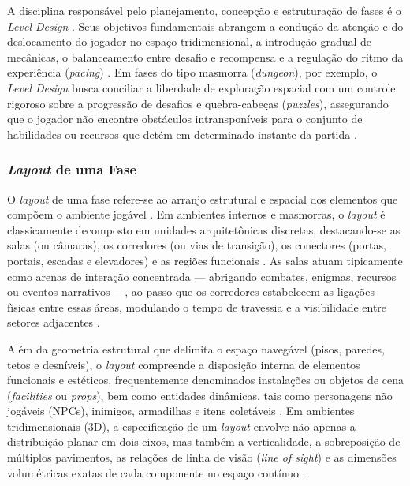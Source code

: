 A disciplina responsável pelo planejamento, concepção e estruturação de fases é o \textit{Level Design} \cite{dormans2010, tanagra, totten2014architectural}. Seus objetivos fundamentais abrangem a condução da atenção e do deslocamento do jogador no espaço tridimensional, a introdução gradual de mecânicas, o balanceamento entre desafio e recompensa e a regulação do ritmo da experiência (\textit{pacing}) \cite{dormans2010, linden2013designing, linden2014dungeons, totten2014architectural}. Em fases do tipo masmorra (\textit{dungeon}), por exemplo, o \textit{Level Design} busca conciliar a liberdade de exploração espacial com um controle rigoroso sobre a progressão de desafios e quebra-cabeças (\textit{puzzles}), assegurando que o jogador não encontre obstáculos intransponíveis para o conjunto de habilidades ou recursos que detém em determinado instante da partida \cite{linden2014dungeons, shaker2016constructive}.

\subsubsection{\textit{Layout} de uma Fase}
\label{sec:layout_fase}

O \textit{layout} de uma fase refere-se ao arranjo estrutural e espacial dos elementos que compõem o ambiente jogável \cite{dormans2010, linden2014dungeons}. Em ambientes internos e masmorras, o \textit{layout} é classicamente decomposto em unidades arquitetônicas discretas, destacando-se as salas (ou câmaras), os corredores (ou vias de transição), os conectores (portas, portais, escadas e elevadores) e as regiões funcionais \cite{linden2014dungeons, shaker2016constructive, xu2025databasedrivenframework3dlevel}. As salas atuam tipicamente como arenas de interação concentrada --- abrigando combates, enigmas, recursos ou eventos narrativos ---, ao passo que os corredores estabelecem as ligações físicas entre essas áreas, modulando o tempo de travessia e a visibilidade entre setores adjacentes \cite{linden2013designing, shaker2016constructive}.

Além da geometria estrutural que delimita o espaço navegável (pisos, paredes, tetos e desníveis), o \textit{layout} compreende a disposição interna de elementos funcionais e estéticos, frequentemente denominados instalações ou objetos de cena (\textit{facilities} ou \textit{props}), bem como entidades dinâmicas, tais como personagens não jogáveis (NPCs), inimigos, armadilhas e itens coletáveis \cite{linden2014dungeons, xu2025constraint}. Em ambientes tridimensionais (3D), a especificação de um \textit{layout} envolve não apenas a distribuição planar em dois eixos, mas também a verticalidade, a sobreposição de múltiplos pavimentos, as relações de linha de visão (\textit{line of sight}) e as dimensões volumétricas exatas de cada componente no espaço contínuo \cite{xu2025constraint, xu2025databasedrivenframework3dlevel}.

